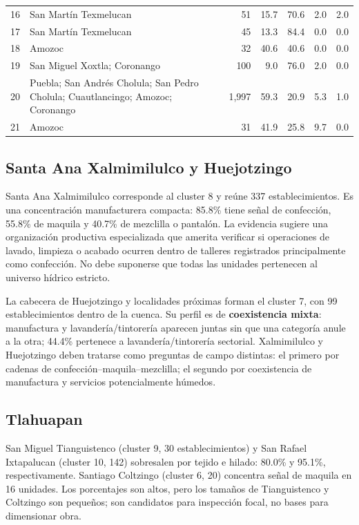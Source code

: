 \documentclass[11pt,letterpaper]{article}
\begin{document}
\begin{landscape}
\begin{longtable}{r p{6.0cm} r r r r r}
16 & San Martín Texmelucan & 51 & 15.7 & 70.6 & 2.0 & 2.0 \\
17 & San Martín Texmelucan & 45 & 13.3 & 84.4 & 0.0 & 0.0 \\
18 & Amozoc & 32 & 40.6 & 40.6 & 0.0 & 0.0 \\
19 & San Miguel Xoxtla; Coronango & 100 & 9.0 & 76.0 & 2.0 & 0.0 \\
20 & Puebla; San Andrés Cholula; San Pedro Cholula; Cuautlancingo; Amozoc; Coronango & 1,997 & 59.3 & 20.9 & 5.3 & 1.0 \\
21 & Amozoc & 31 & 41.9 & 25.8 & 9.7 & 0.0 \\
\bottomrule
\end{longtable}
\normalsize
\end{landscape}

\subsection*{Santa Ana Xalmimilulco y Huejotzingo}

Santa Ana Xalmimilulco corresponde al cluster 8 y reúne 337 establecimientos. Es una concentración manufacturera compacta: 85.8\% tiene señal de confección, 55.8\% de maquila y 40.7\% de mezclilla o pantalón. La evidencia sugiere una organización productiva especializada que amerita verificar si operaciones de lavado, limpieza o acabado ocurren dentro de talleres registrados principalmente como confección. No debe suponerse que todas las unidades pertenecen al universo hídrico estricto.

La cabecera de Huejotzingo y localidades próximas forman el cluster 7, con 99 establecimientos dentro de la cuenca. Su perfil es de \textbf{coexistencia mixta}: manufactura y lavandería/tintorería aparecen juntas sin que una categoría anule a la otra; 44.4\% pertenece a lavandería/tintorería sectorial. Xalmimilulco y Huejotzingo deben tratarse como preguntas de campo distintas: el primero por cadenas de confección--maquila--mezclilla; el segundo por coexistencia de manufactura y servicios potencialmente húmedos.

\subsection*{Tlahuapan}

San Miguel Tianguistenco (cluster 9, 30 establecimientos) y San Rafael Ixtapalucan (cluster 10, 142) sobresalen por tejido e hilado: 80.0\% y 95.1\%, respectivamente. Santiago Coltzingo (cluster 6, 20) concentra señal de maquila en 16 unidades. Los porcentajes son altos, pero los tamaños de Tianguistenco y Coltzingo son pequeños; son candidatos para inspección focal, no bases para dimensionar obra.
\end{document}
